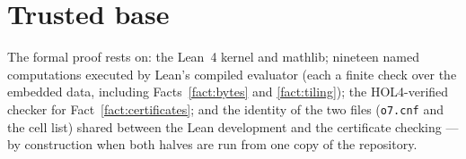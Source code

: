 \chapter*{Trusted base}
The formal proof rests on: the Lean~4 kernel and mathlib; nineteen named
computations executed by Lean's compiled evaluator (each a finite check over
the embedded data, including Facts~\ref{fact:bytes} and \ref{fact:tiling});
the HOL4-verified checker for Fact~\ref{fact:certificates}; and the identity
of the two files (\texttt{o7.cnf} and the cell list) shared between the Lean
development and the certificate checking --- by construction when both halves
are run from one copy of the repository.
